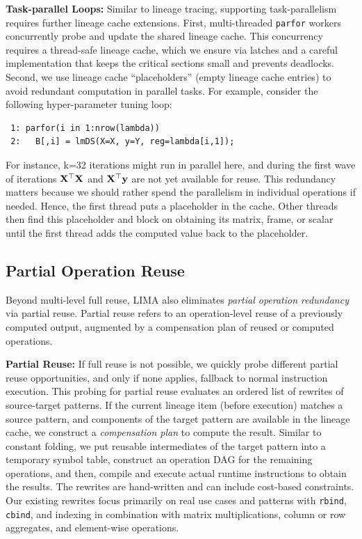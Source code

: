 \textbf{Task-parallel Loops:} Similar to lineage tracing, supporting task-parallelism requires further lineage cache extensions. First, multi-threaded \texttt{parfor} workers concurrently probe and update the shared lineage cache. This concurrency requires a thread-safe lineage cache, which we ensure via latches and a careful implementation that keeps the critical sections small and prevents deadlocks. Second, we use lineage cache ``placeholders'' (empty lineage cache entries) to avoid redundant computation in parallel tasks. For example, consider the following hyper-parameter tuning loop:
\begin{lstlisting}
 1: parfor(i in 1:nrow(lambda))
 2:   B[,i] = lmDS(X=X, y=Y, reg=lambda[i,1]);
\end{lstlisting}
For instance, k=32 iterations might run in parallel here, and during the first wave of iterations $\mathbf{X}^{\top}\mathbf{X}$ and $\mathbf{X}^{\top}\mathbf{y}$ are not yet available for reuse. This redundancy matters because we should rather spend the parallelism in individual operations if needed. Hence, the first thread puts a placeholder in the cache. Other threads then find this placeholder and block on obtaining its matrix, frame, or scalar until the first thread adds the computed value back to the placeholder.


\subsection{Partial Operation Reuse}
\label{sec:partial}

Beyond multi-level full reuse, LIMA also eliminates \emph{partial operation redundancy} via partial reuse. Partial reuse refers to an operation-level reuse of a previously computed output, augmented by a compensation plan of reused or computed operations. 


\textbf{Partial Reuse:} If full reuse is not possible, we quickly probe different partial reuse opportunities, and only if none applies, fallback to normal instruction execution. This probing for partial reuse evaluates an ordered list of rewrites of source-target patterns. If the current lineage item (before execution) matches a source pattern, and components of the target pattern are available in the lineage cache, we construct a \emph{compensation plan} to compute the result. Similar to constant folding, we put reusable intermediates of the target pattern into a temporary symbol table, construct an operation DAG for the remaining operations, and then, compile and execute actual runtime instructions to obtain the results. The rewrites are hand-written and can include cost-based constraints. Our existing rewrites focus primarily on real use cases and patterns with \texttt{rbind}, \texttt{cbind}, and indexing in combination with matrix multiplications, column or row aggregates, and element-wise operations.

